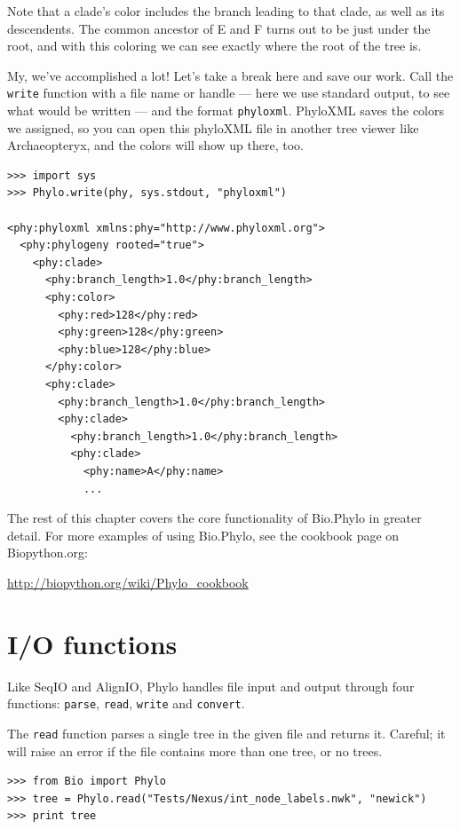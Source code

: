 \documentclass{report}
\begin{document}
Note that a clade's color includes the branch leading to that clade, as well as its
descendents. The common ancestor of E and F turns out to be just under the root, and with this
coloring we can see exactly where the root of the tree is.

My, we've accomplished a lot! Let's take a break here and save our work.  Call the
\texttt{write} function with a file name or handle --- here we use standard output, to see what
would be written --- and the format \texttt{phyloxml}.  PhyloXML saves the colors we assigned,
so you can open this phyloXML file in another tree viewer like Archaeopteryx, and the colors
will show up there, too.

\begin{verbatim}
>>> import sys
>>> Phylo.write(phy, sys.stdout, "phyloxml")

<phy:phyloxml xmlns:phy="http://www.phyloxml.org">
  <phy:phylogeny rooted="true">
    <phy:clade>
      <phy:branch_length>1.0</phy:branch_length>
      <phy:color>
        <phy:red>128</phy:red>
        <phy:green>128</phy:green>
        <phy:blue>128</phy:blue>
      </phy:color>
      <phy:clade>
        <phy:branch_length>1.0</phy:branch_length>
        <phy:clade>
          <phy:branch_length>1.0</phy:branch_length>
          <phy:clade>
            <phy:name>A</phy:name>
            ...
\end{verbatim}

The rest of this chapter covers the core functionality of Bio.Phylo in greater detail. For more
examples of using Bio.Phylo, see the cookbook page on Biopython.org:

\url{http://biopython.org/wiki/Phylo_cookbook}

\section{I/O functions}

Like SeqIO and AlignIO, Phylo handles file input and output through four functions:
\verb|parse|, \verb|read|, \verb|write| and \verb|convert|.

The \verb|read| function parses a single tree in the given file and returns it. Careful; it
will raise an error if the file contains more than one tree, or no trees.

\begin{verbatim}
>>> from Bio import Phylo
>>> tree = Phylo.read("Tests/Nexus/int_node_labels.nwk", "newick")
>>> print tree
\end{verbatim}
\end{document}
